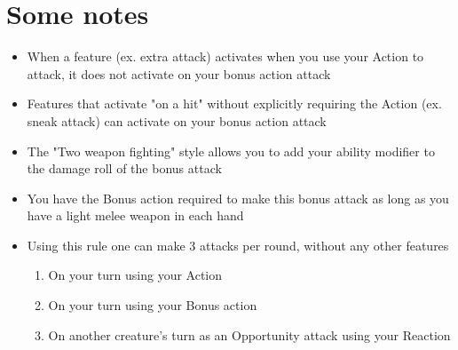 \documentclass[a4paper]{article}
\begin{document}
\section{Some notes}
\begin{itemize}
\item When a feature (ex. extra attack) activates when you use your Action to attack, it does not activate on your bonus action attack
\item Features that activate "on a hit" without explicitly requiring the Action (ex. sneak attack) can activate on your bonus action attack
\item The "Two weapon fighting" style allows you to add your ability modifier to the damage roll of the bonus attack
\item You have the Bonus action required to make this bonus attack as long as you have a light melee weapon in each hand
\item Using this rule one can make 3 attacks per round, without any other features
	\begin{enumerate}
	\item On your turn using your Action
	\item On your turn using your Bonus action
	\item On another creature's turn as an Opportunity attack using your Reaction
	\end{enumerate}
\end{itemize}
\end{document}
